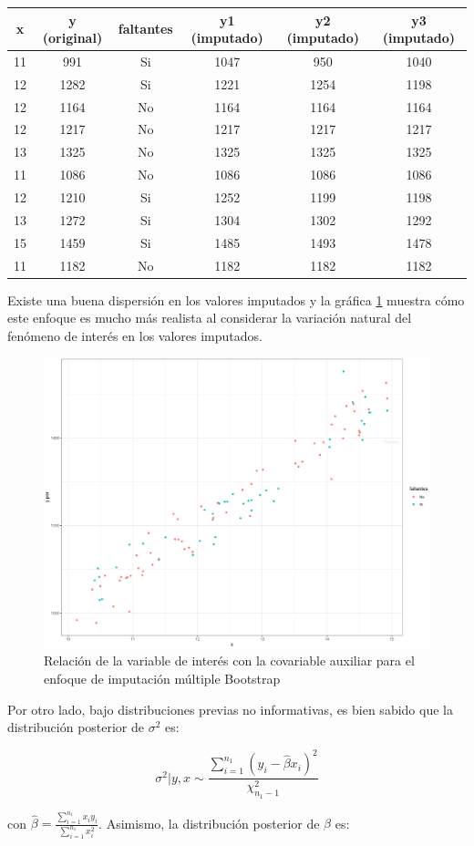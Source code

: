 \documentclass[
  12pt,
  spanish,
]{book}
\begin{document}
\begin{longtable}[]{@{}cccccc@{}}
\toprule
x & y (original) & faltantes & y1 (imputado) & y2 (imputado) & y3 (imputado) \\
\midrule
\endhead
11 & 991 & Si & 1047 & 950 & 1040 \\
12 & 1282 & Si & 1221 & 1254 & 1198 \\
12 & 1164 & No & 1164 & 1164 & 1164 \\
12 & 1217 & No & 1217 & 1217 & 1217 \\
13 & 1325 & No & 1325 & 1325 & 1325 \\
11 & 1086 & No & 1086 & 1086 & 1086 \\
12 & 1210 & Si & 1252 & 1199 & 1198 \\
13 & 1272 & Si & 1304 & 1302 & 1292 \\
15 & 1459 & Si & 1485 & 1493 & 1478 \\
11 & 1182 & No & 1182 & 1182 & 1182 \\
\bottomrule
\end{longtable}

Existe una buena dispersión en los valores imputados y la gráfica \ref{fig:figim3} muestra cómo este enfoque es mucho más realista al considerar la variación natural del fenómeno de interés en los valores imputados.

\begin{figure}
\includegraphics[width=0.5\linewidth]{Pics/im3} \caption{Relación de la variable de interés con la covariable auxiliar para el enfoque de imputación múltiple Bootstrap}\label{fig:figim3}
\end{figure}

Por otro lado, bajo distribuciones previas no informativas, es bien sabido que la distribución posterior de \(\sigma^2\) es:

\[
\sigma^2| y, x  \sim \frac{\sum_{i = 1}^{n_1} (y_i - \hat{\beta} x_i)^2}{\chi ^2_{n_1-1}}
\]

con \(\hat{\beta} = \frac{\sum_{i = 1}^{n_1} x_i y_i}{\sum_{i = 1}^{n_1} x_i^2}\). Asimismo, la distribución posterior de \(\beta\) es:
\end{document}
